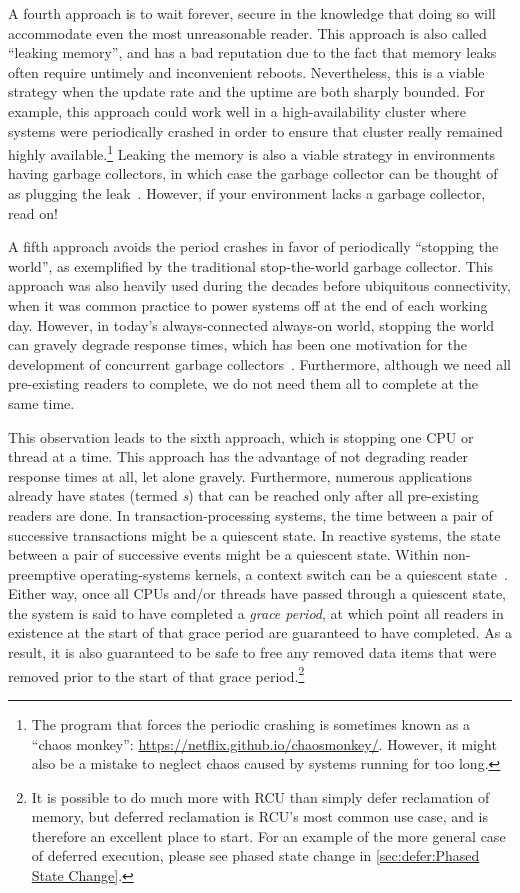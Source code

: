 A fourth approach is to wait forever, secure in the knowledge that
doing so will accommodate even the most unreasonable reader.
This approach is also called ``leaking memory'', and has a bad reputation
due to the fact that memory leaks often require untimely and
inconvenient reboots.
Nevertheless, this is a viable strategy when the update rate and the
uptime are both sharply bounded.
For example, this approach could work well in a high-availability
cluster where systems were periodically crashed in order to ensure
that cluster really remained highly available.\footnote{
	The program that forces the periodic crashing is sometimes
	known as a ``chaos monkey'':
	\url{https://netflix.github.io/chaosmonkey/}.
	However, it might also be a mistake to neglect chaos caused
	by systems running for too long.}
Leaking the memory is also a viable strategy in environments having
garbage collectors, in which case the garbage collector can be thought
of as plugging the leak~\cite{Kung80}.
However, if your environment lacks a garbage collector, read on!

A fifth approach avoids the period crashes in favor of periodically
``stopping the world'', as exemplified by the traditional stop-the-world
garbage collector.
This approach was also heavily used during the decades before
ubiquitous connectivity, when it was common practice to power systems
off at the end of each working day.
However, in today's always-connected always-on world, stopping the world
can gravely degrade response times, which has been one motivation for the
development of concurrent garbage collectors~\cite{DavidFBacon2003RTGC}.
Furthermore, although we need all pre-existing readers to complete, we do
not need them all to complete at the same time.

This observation leads to the sixth approach, which is stopping
one CPU or thread at a time.
This approach has the advantage of not degrading reader response times
at all, let alone gravely.
Furthermore, numerous applications already have states (termed
\emph{s}) that can be
reached only after all pre-existing readers are done.
In transaction-processing systems, the time between a pair of
successive transactions might be a quiescent state.
In reactive systems, the state between a pair of successive events
might be a quiescent state.
Within non-preemptive operating-systems kernels, a context switch can be
a quiescent state~\cite{McKenney98}.
Either way, once all CPUs and/or threads have passed through a quiescent
state, the system is said to have completed a \emph{grace period},
at which point all readers in existence at the start of that grace period
are guaranteed to have completed.
As a result, it is also guaranteed to be safe to free any removed data
items that were removed prior to the start of that grace period.\footnote{
	It is possible to do much more with RCU than simply defer
	reclamation of memory, but deferred reclamation is RCU's most
	common use case, and is therefore an excellent place to start.
	For an example of the more general case of deferred execution,
	please see phased state change in \cref{sec:defer:Phased State
	Change}.}


